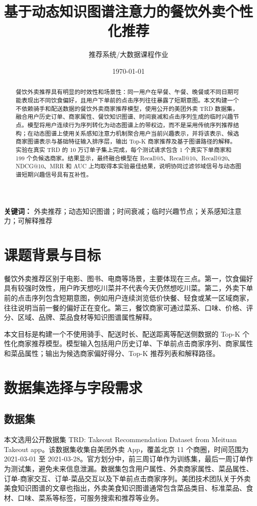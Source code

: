 \documentclass[UTF8,a4paper,12pt]{ctexart}
\title{\textbf{基于动态知识图谱注意力的餐饮外卖个性化推荐}}
\author{推荐系统/大数据课程作业}
\date{\today}
\begin{document}
\maketitle

\begin{abstract}
餐饮外卖推荐具有明显的时效性和场景性：同一用户在早餐、午餐、晚餐或不同日期可能表现出不同饮食偏好，且用户下单前的点击序列往往暴露了短期意图。本文构建一个不依赖骑手和配送数据的餐饮外卖商家推荐模型，使用公开的美团外卖 TRD 数据集，融合用户历史订单、商家属性、餐饮知识图谱、时间衰减和点击序列生成的临时兴趣节点。模型将用户连续行为序列转化为动态图谱上的带权边，而不是采用传统序列推荐结构；在动态图谱上使用关系感知注意力机制聚合用户当前兴趣表示，并将该表示、候选商家图谱表示与基础特征输入排序层，输出 Top-K 商家推荐及基于图谱路径的解释。实验在真实 TRD 的 10 万订单子集上完成，每个测试请求包含 1 个真实下单商家和 199 个负候选商家。结果显示，最终融合模型在 Recall@5、Recall@10、Recall@20、NDCG@10、MRR 和 AUC 上均取得本实验最佳结果，说明协同过滤邻域信号与动态图谱短期兴趣信号具有互补性。
\end{abstract}

\noindent\textbf{关键词：} 外卖推荐；动态知识图谱；时间衰减；临时兴趣节点；关系感知注意力；可解释推荐

\section{课题背景与目标}

餐饮外卖推荐区别于电影、图书、电商等场景，主要体现在三点。第一，饮食偏好具有较强时效性，用户昨天想吃川菜并不代表今天仍然想吃川菜。第二，外卖下单前的点击序列包含短期意图，例如用户连续浏览低价快餐、轻食或某一区域商家，往往说明当前一餐的偏好正在变化。第三，餐饮商家可通过菜系、口味、价格、评分、区域、品牌、菜品食材等知识图谱属性解释。

本文目标是构建一个不使用骑手、配送时长、配送距离等配送侧数据的 Top-K 个性化商家推荐模型。模型输入包括用户历史订单、下单前点击商家序列、商家属性和菜品属性；输出为候选商家偏好得分、Top-K 推荐列表和解释路径。

\section{数据集选择与字段需求}

\subsection{数据集}

本文选用公开数据集 TRD: Takeout Recommendation Dataset from Meituan Takeout app\cite{trd2023}。该数据集收集自美团外卖 App，覆盖北京 11 个商圈，时间范围为 2021-03-01 至 2021-03-28。官方划分中，前三周订单作为训练集，最后一周订单作为测试集，避免未来信息泄漏。数据集包含用户属性、外卖商家属性、菜品属性、订单-商家交互、订单-菜品交互以及下单前点击商家序列。美团技术团队关于外卖美食知识图谱的文章也指出，外卖美食知识图谱通常包含菜品类目、标准菜品、食材、口味、菜系等标签，可服务搜索和推荐等业务\cite{meituan_kg_blog}。
\end{document}
